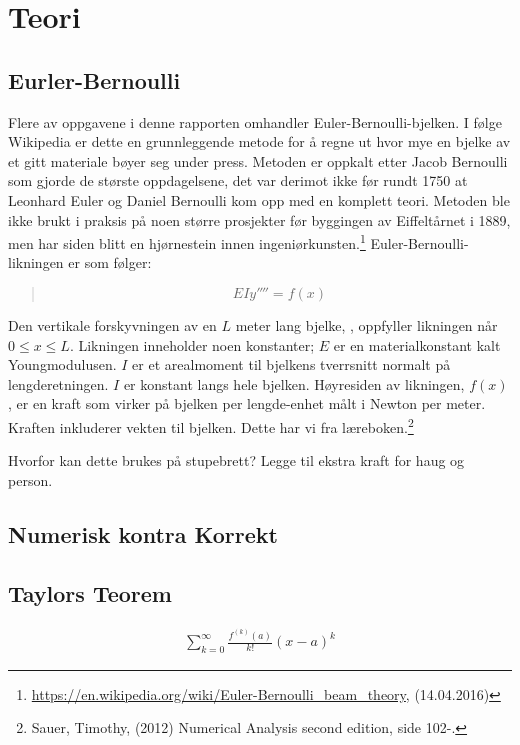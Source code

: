 \section{Teori}

\subsection{Eurler-Bernoulli}
Flere av oppgavene i denne rapporten omhandler Euler-Bernoulli-bjelken. I følge Wikipedia er dette en grunnleggende metode for å regne ut hvor mye en bjelke av et gitt materiale bøyer seg under press. Metoden er oppkalt etter Jacob Bernoulli som gjorde de største oppdagelsene, det var derimot ikke før rundt 1750 at Leonhard Euler og Daniel Bernoulli kom opp med en komplett teori. Metoden ble ikke brukt i praksis på noen større prosjekter før byggingen av Eiffeltårnet i 1889, men har siden blitt en hjørnestein innen ingeniørkunsten.\footnote{\url{https://en.wikipedia.org/wiki/Euler-Bernoulli_beam_theory}, (14.04.2016)} Euler-Bernoulli-likningen er som følger:
\begin{quote}
\begin{equation}
EIy''''=f(x)
\end{equation}
\end{quote}
Den vertikale forskyvningen av en $L$ meter lang bjelke, , oppfyller likningen når $0\leq x\leq L$. Likningen inneholder noen konstanter; $E$ er en materialkonstant kalt Youngmodulusen. $I$ er et arealmoment til bjelkens tverrsnitt normalt på lengderetningen. $I$ er konstant langs hele bjelken. Høyresiden av likningen, $f(x)$, er en kraft som virker på bjelken per lengde-enhet målt i Newton per meter. Kraften inkluderer vekten til bjelken. Dette har vi fra læreboken.\footnote{Sauer, Timothy, (2012) Numerical Analysis second edition, side 102-.}

Hvorfor kan dette brukes på stupebrett?
Legge til ekstra kraft for haug og person.

\subsection{Numerisk kontra Korrekt}

\subsection{Taylors Teorem}
\begin{align*}
 \sum_{k = 0}^{\infty}\frac{f^{(k)}(a)}{k!}(x-a)^{k}
 \end{align*}
 
